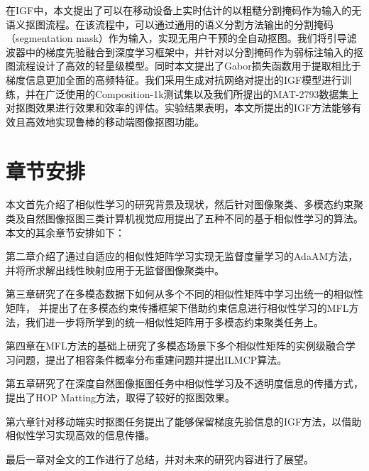 在IGF中，本文提出了可以在移动设备上实时估计的以粗糙分割掩码作为输入的无语义抠图流程。在该流程中，可以通过通用的语义分割方法输出的分割掩码（segmentation mask）作为输入，实现无用户干预的全自动抠图。我们将引导滤波器\cite{he2010guided}中的梯度先验融合到深度学习框架中，并针对以分割掩码作为弱标注输入的抠图流程设计了高效的轻量级模型。同时本文提出了Gabor损失函数用于提取相比于梯度信息更加全面的高频特征。我们采用生成对抗网络对提出的IGF模型进行训练，并在广泛使用的Composition-1k测试集以及我们所提出的MAT-2793数据集上对抠图效果进行效果和效率的评估。实验结果表明，本文所提出的IGF方法能够有效且高效地实现鲁棒的移动端图像抠图功能。



\section{章节安排}
本文首先介绍了相似性学习的研究背景及现状，然后针对图像聚类、多模态约束聚类及自然图像抠图三类计算机视觉应用提出了五种不同的基于相似性学习的算法。
本文的其余章节安排如下：

第二章介绍了通过自适应的相似性矩阵学习实现无监督度量学习的AdaAM方法，并将所求解出线性映射应用于无监督图像聚类中。

第三章研究了在多模态数据下如何从多个不同的相似性矩阵中学习出统一的相似性矩阵，
并提出了在多模态约束传播框架下借助约束信息进行相似性学习的MFL方法，我们进一步将所学到的统一相似性矩阵用于多模态约束聚类任务上。

第四章在MFL方法的基础上研究了多模态场景下多个相似性矩阵的实例级融合学习问题，提出了相容条件概率分布重建问题并提出ILMCP算法。

第五章研究了在深度自然图像抠图任务中相似性学习及不透明度信息的传播方式，提出了HOP Matting方法，取得了较好的抠图效果。

第六章针对移动端实时抠图任务提出了能够保留梯度先验信息的IGF方法，以借助相似性学习实现高效的信息传播。

最后一章对全文的工作进行了总结，并对未来的研究内容进行了展望。